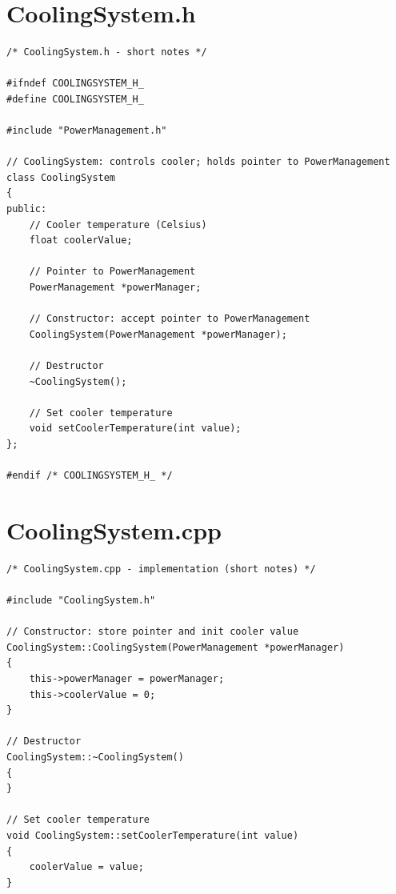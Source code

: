 \documentclass[11pt]{article}
\begin{document}
\section*{CoolingSystem.h}
\begin{lstlisting}
/* CoolingSystem.h - short notes */

#ifndef COOLINGSYSTEM_H_
#define COOLINGSYSTEM_H_

#include "PowerManagement.h"

// CoolingSystem: controls cooler; holds pointer to PowerManagement
class CoolingSystem
{
public:
    // Cooler temperature (Celsius)
    float coolerValue;

    // Pointer to PowerManagement
    PowerManagement *powerManager;

    // Constructor: accept pointer to PowerManagement
    CoolingSystem(PowerManagement *powerManager);

    // Destructor
    ~CoolingSystem();

    // Set cooler temperature
    void setCoolerTemperature(int value);
};

#endif /* COOLINGSYSTEM_H_ */
\end{lstlisting}

\section*{CoolingSystem.cpp}
\begin{lstlisting}
/* CoolingSystem.cpp - implementation (short notes) */

#include "CoolingSystem.h"

// Constructor: store pointer and init cooler value
CoolingSystem::CoolingSystem(PowerManagement *powerManager)
{
    this->powerManager = powerManager;
    this->coolerValue = 0;
}

// Destructor
CoolingSystem::~CoolingSystem()
{
}

// Set cooler temperature
void CoolingSystem::setCoolerTemperature(int value)
{
    coolerValue = value;
}
\end{lstlisting}
\end{document}
